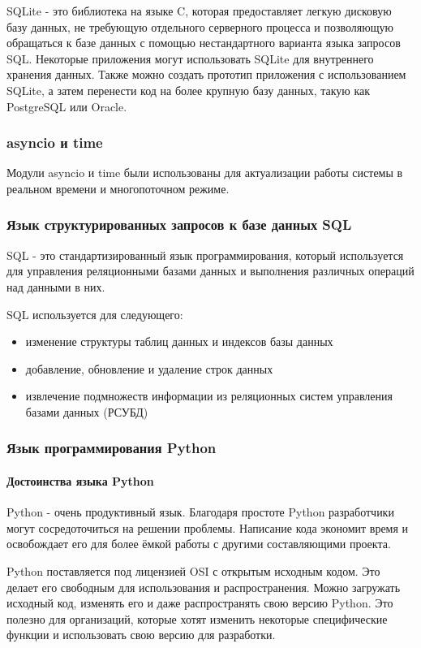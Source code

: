 SQLite - это библиотека на языке C, которая предоставляет легкую дисковую базу данных, не требующую отдельного серверного процесса и позволяющую обращаться к базе данных с помощью нестандартного варианта языка запросов SQL. Некоторые приложения могут использовать SQLite для внутреннего хранения данных. Также можно создать прототип приложения с использованием SQLite, а затем перенести код на более крупную базу данных, такую как PostgreSQL или Oracle.

\subsubsection {asyncio и time}
Модули asyncio и time были использованы для актуализации работы системы в реальном времени и многопоточном режиме.


\subsubsection{Язык структурированных запросов к базе данных SQL}
SQL - это стандартизированный язык программирования, который используется для управления реляционными базами данных и выполнения различных операций над данными в них. 

SQL используется для следующего:
\begin{itemize}
	\item изменение структуры таблиц данных и индексов базы данных
	\item добавление, обновление и удаление строк данных
	\item извлечение подмножеств информации из реляционных систем управления базами данных (РСУБД)
\end{itemize}


\subsubsection{Язык программирования Python}

\paragraph{Достоинства языка Python}
Python - очень продуктивный язык. Благодаря простоте Python разработчики могут сосредоточиться на решении проблемы. Написание кода экономит время и освобождает его для более ёмкой работы с другими составляющими проекта.

Python поставляется под лицензией OSI с открытым исходным кодом. Это делает его свободным для использования и распространения. Можно загружать исходный код, изменять его и даже распространять свою версию Python. Это полезно для организаций, которые хотят изменить некоторые специфические функции и использовать свою версию для разработки.

